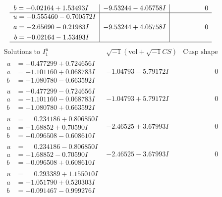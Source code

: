 \documentclass[1p]{elsarticle_modified}
\theoremstyle{definition}
\newcommand{\I}{\sqrt{-1}}
\begin{document}
$$\begin{array}{c|c|c}
\begin{aligned}
b &= -0.02164 + 1.53493 I\end{aligned}
 & -9.53244 - 4.05758 I & \phantom{-0.000000 } 0 \\ \hline\begin{aligned}
u &= -0.555460 - 0.700572 I \\
a &= -2.65690 - 0.21983 I \\
b &= -0.02164 - 1.53493 I\end{aligned}
 & -9.53244 + 4.05758 I & \phantom{-0.000000 } 0\\
 \hline 
 \end{array}$$\newpage$$\begin{array}{c|c|c}  
\text{Solutions to }I^u_{1}& \I (\text{vol} + \sqrt{-1}CS) & \text{Cusp shape}\\
 \hline 
\begin{aligned}
u &= -0.477299 + 0.724656 I \\
a &= -1.101160 + 0.068783 I \\
b &= -1.080780 - 0.663592 I\end{aligned}
 & -1.04793 - 5.79172 I & \phantom{-0.000000 } 0 \\ \hline\begin{aligned}
u &= -0.477299 - 0.724656 I \\
a &= -1.101160 - 0.068783 I \\
b &= -1.080780 + 0.663592 I\end{aligned}
 & -1.04793 + 5.79172 I & \phantom{-0.000000 } 0 \\ \hline\begin{aligned}
u &= \phantom{-}0.234186 + 0.806850 I \\
a &= -1.68852 + 0.70590 I \\
b &= -0.096508 - 0.608610 I\end{aligned}
 & -2.46525 + 3.67993 I & \phantom{-0.000000 } 0 \\ \hline\begin{aligned}
u &= \phantom{-}0.234186 - 0.806850 I \\
a &= -1.68852 - 0.70590 I \\
b &= -0.096508 + 0.608610 I\end{aligned}
 & -2.46525 - 3.67993 I & \phantom{-0.000000 } 0 \\ \hline\begin{aligned}
u &= \phantom{-}0.293389 + 1.155010 I \\
a &= -1.051790 + 0.520303 I \\
b &= -0.091467 - 0.999276 I\end{aligned}

\end{array}$$
\end{document}

